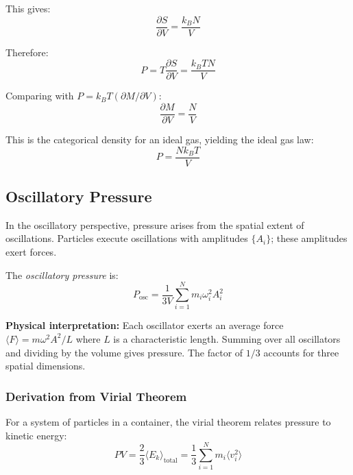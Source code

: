 This gives:
\begin{equation}
\frac{\partial S}{\partial V} = \frac{k_B N}{V}
\end{equation}

Therefore:
\begin{equation}
P = T \frac{\partial S}{\partial V} = \frac{k_B T N}{V}
\end{equation}

Comparing with $P = k_B T (\partial M/\partial V)$:
\begin{equation}
\frac{\partial M}{\partial V} = \frac{N}{V}
\end{equation}

This is the categorical density for an ideal gas, yielding the ideal gas law:
\begin{equation}
P = \frac{Nk_B T}{V}
\end{equation}

\subsection{Oscillatory Pressure}

In the oscillatory perspective, pressure arises from the spatial extent of oscillations. Particles execute oscillations with amplitudes $\{A_i\}$; these amplitudes exert forces.

\begin{definition}
The \textit{oscillatory pressure} is:
\begin{equation}
\boxed{P_{\text{osc}} = \frac{1}{3V}\sum_{i=1}^{N} m_i \omega_i^2 A_i^2}
\label{eq:oscillatory_pressure}
\end{equation}
\end{definition}

\textbf{Physical interpretation:} Each oscillator exerts an average force $\langle F \rangle = m\omega^2 A^2/L$ where $L$ is a characteristic length. Summing over all oscillators and dividing by the volume gives pressure. The factor of $1/3$ accounts for three spatial dimensions.

\subsubsection{Derivation from Virial Theorem}

For a system of particles in a container, the virial theorem relates pressure to kinetic energy:
\begin{equation}
PV = \frac{2}{3}\langle E_k \rangle_{\text{total}} = \frac{1}{3}\sum_{i=1}^{N} m_i \langle v_i^2 \rangle
\end{equation}

